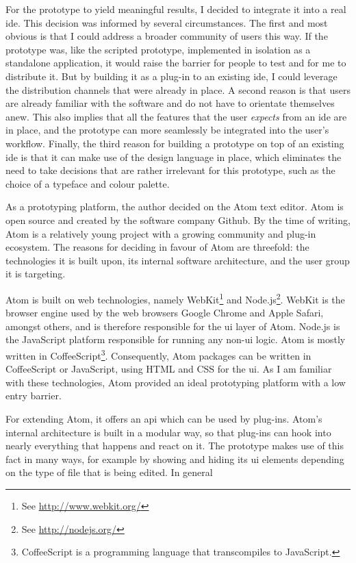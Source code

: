 For the prototype to yield meaningful results, I decided to integrate it
into a real \ac{ide}. This decision was informed by several
circumstances. The first and most obvious is that I could address a
broader community of users this way. If the prototype was, like the
scripted prototype, implemented in isolation as a standalone
application, it would raise the barrier for people to test and for me to
distribute it. But by building it as a plug-in to an existing \ac{ide},
I could leverage the distribution channels that were already in place. A
second reason is that users are already familiar with the software and
do not have to orientate themselves anew. This also implies that all the
features that the user \emph{expects} from an \ac{ide} are in place, and
the prototype can more seamlessly be integrated into the user’s
workflow. Finally, the third reason for building a prototype on top of
an existing \ac{ide} is that it can make use of the design language in
place, which eliminates the need to take decisions that are rather
irrelevant for this prototype, such as the choice of a typeface and
colour palette.

As a prototyping platform, the author decided on the Atom text editor.
Atom is open source and created by the software company Github. By the
time of writing, Atom is a relatively young project with a growing
community and plug-in ecosystem. The reasons for deciding in favour of
Atom are threefold: the technologies it is built upon, its internal
software architecture, and the user group it is targeting.

Atom is built on web technologies, namely
WebKit\footnote{See \url{http://www.webkit.org/}} and
Node.js\footnote{See \url{http://nodejs.org/}}. WebKit is the browser
engine used by the web browsers Google Chrome and Apple Safari, amongst
others, and is therefore responsible for the \acl{ui} layer of Atom.
Node.js is the JavaScript platform responsible for running any
non-\ac{ui} logic. Atom is mostly written in
CoffeeScript\footnote{CoffeeScript is a programming language that transcompiles to JavaScript.}.
Consequently, Atom packages can be written in CoffeeScript or
JavaScript, using HTML and CSS for the \ac{ui}. As I am familiar with
these technologies, Atom provided an ideal prototyping platform with a
low entry barrier.

For extending Atom, it offers an \ac{api} which can be used by plug-ins.
Atom’s internal architecture is built in a modular way, so that plug-ins
can hook into nearly everything that happens and react on it. The
prototype makes use of this fact in many ways, for example by showing
and hiding its \ac{ui} elements depending on the type of file that is
being edited. In general

